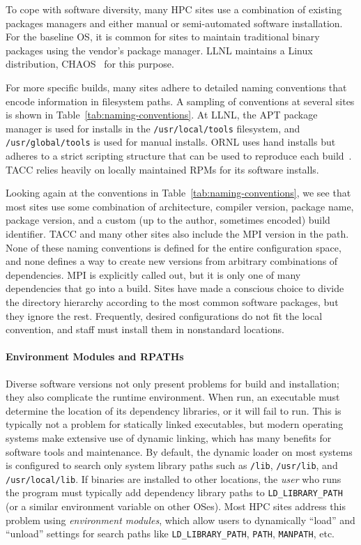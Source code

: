 To cope with software diversity, many HPC sites use a combination of existing
packages managers and either manual or semi-automated software installation.  
For the baseline OS, it is common for sites to maintain traditional binary
packages using the vendor's package manager.  LLNL maintains a Linux 
distribution, CHAOS~\cite{chaos} for this purpose.

For more specific builds, many sites adhere to detailed naming conventions
that encode information in filesystem paths. A sampling of conventions
at several sites is shown in Table~\ref{tab:naming-conventions}. At LLNL, the
APT package manager is used for installs in the {\tt /usr/local/tools} 
filesystem, and {\tt /usr/global/tools} is used for manual installs.
ORNL uses hand installs but adheres to a strict scripting structure
that can be used to reproduce each build~\cite{jones+:cug08}.
TACC relies heavily on locally maintained RPMs for its software installs.

Looking again at the conventions in Table~\ref{tab:naming-conventions},
we see that most sites use some combination of architecture, compiler version,
package name, package version, and a custom (up to the author, sometimes
encoded) build identifier.  TACC and many other sites also include the MPI
version in the path. None of these naming conventions is defined for
the entire configuration space, and none defines a way to create new versions
from arbitrary combinations of dependencies.  MPI is explicitly called out,
but it is only one of many dependencies that go into a build.
Sites have made a conscious choice to divide the directory hierarchy
according to the most common software packages, but they ignore the rest.
Frequently, desired configurations do not fit the local convention, and
staff must install them in nonstandard locations.

\paragraph{Environment Modules and RPATHs}

Diverse software versions not only present problems for build and installation; 
they also complicate the runtime environment. When run, an executable
must determine the location of its dependency libraries, or it will fail to run.
This is typically not a problem for statically linked executables, but modern
operating systems make extensive use of dynamic linking, which has many 
benefits for software tools and maintenance.
By default, the dynamic loader on most systems is configured to search only
system library paths such as {\tt /lib}, {\tt /usr/lib}, and
{\tt /usr/local/lib}.  If binaries are installed to other locations, the
{\it user} who runs the program must typically add dependency library paths to
{\tt LD\_LIBRARY\_PATH} (or a similar environment variable on other OSes).
Most HPC sites address this problem using {\it environment modules}, which allow
users to dynamically ``load'' and ``unload'' settings for search paths like
{\tt LD\_LIBRARY\_PATH}, {\tt PATH}, {\tt MANPATH}, etc.

